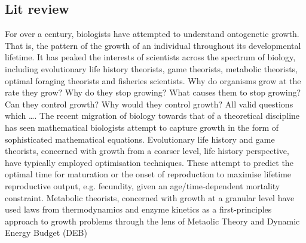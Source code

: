 \documentclass[a4paper]{article} %
\begin{document}
    \subsection{Lit review}
        For over a century, biologists have attempted to understand ontogenetic growth. That is, the pattern of the growth of an individual throughout its developmental lifetime. It has peaked the interests of scientists across the spectrum of biology, including evolutionary life history theorists, game theorists, metabolic theorists, optimal foraging theorists and fisheries scientists. Why do organisms grow at the rate they grow? Why do they stop growing? What causes them to stop growing? Can they control growth? Why would they control growth? All valid questions which \dots. The recent migration of biology towards that of a theoretical discipline has seen mathematical biologists attempt to capture growth in the form of sophisticated mathematical equations. Evolutionary life history and game theorists, concerned with growth from a coarser level, life history perspective, have typically employed optimisation techniques. These attempt to predict the optimal time for maturation or the onset of reproduction to maximise lifetime reproductive output, e.g. fecundity, given an age/time-dependent mortality constraint. Metabolic theorists, concerned with growth at a granular level have used laws from thermodynamics and enzyme kinetics as a first-principles approach to growth problems through the lens of Metaolic Theory and Dynamic Energy Budget (DEB)
\end{document}
